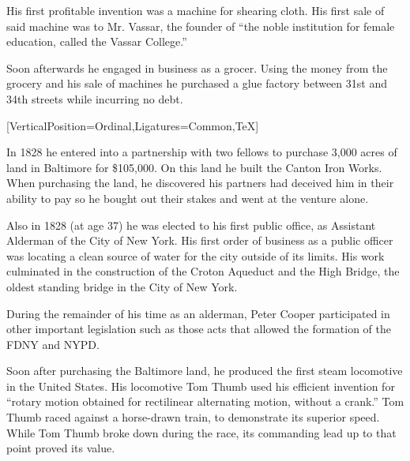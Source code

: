 \documentclass{article}
\begin{document}
\begin{minipage}[t]{0.46\linewidth}
\begin{enumList}
\item His first profitable invention was a machine for shearing cloth. His first
sale of said machine was to Mr. Vassar, the founder of ``the noble institution
for female education, called the Vassar College.''

\item Soon afterwards he engaged in business as a grocer. Using the money from
the grocery and his sale of machines he purchased a {
glue factory} between 31st
and 34th streets while { incurring no debt}.
\setcounter{enumTemp}{\value{enumListi}}
\end{enumList}
\end{minipage}\hfill
\begin{minipage}[t]{0.46\linewidth}
[VerticalPosition=Ordinal,Ligatures={Common,TeX}]
\fontsize{10.7pt}{12.7pt}\selectfont
\raggedright
\upshape
\begin{enumList}
\setcounter{enumListi}{\value{enumTemp}}

\item In 1828 he entered into a partnership with two fellows to purchase 3,000
acres of land in Baltimore for \$105,000. On this land he built the
{ Canton Iron Works}. When purchasing the land, he
discovered his partners had deceived him in their ability to pay so he bought
out their stakes and went at the venture alone.

\item Also in 1828 (at age 37) he was elected to his first public office, as
{ Assistant Alderman} of the City of New York. His first
order of business as a public officer was locating a clean source of water
for the city outside of its limits. His work culminated in the construction of
the { Croton Aqueduct} and the {
High Bridge}, the oldest standing bridge in the City of New York.

\item During the remainder of his time as an alderman, Peter Cooper participated in other important legislation such as those acts that { allowed the formation of the FDNY and NYPD}.

\item Soon after purchasing the Baltimore land, he produced the
{ first steam
locomotive in the United States}. His locomotive Tom Thumb used his efficient
invention for ``rotary motion obtained for rectilinear alternating motion,
without a crank.'' Tom Thumb raced against a horse-drawn train,
to demonstrate its superior speed. While Tom Thumb broke down during the race,
its commanding lead up to that point proved its value.


\end{enumList}
\end{minipage}
\end{document}
